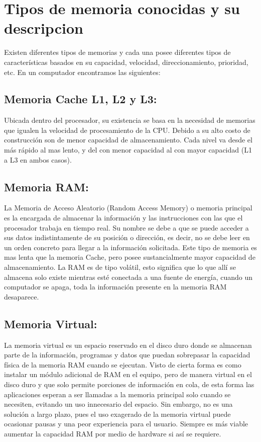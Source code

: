 \documentclass{article}
\begin{document}
\section{Tipos de memoria conocidas y su descripcion} \label{types}
Existen diferentes tipos de memorias y cada una posee diferentes tipos de características basados en su capacidad, velocidad, direccionamiento, prioridad, etc. En un computador encontramos las siguientes:

\subsection{Memoria Cache L1, L2 y L3: }
Ubicada dentro del procesador, su existencia se basa en la necesidad de memorias que igualen la velocidad de procesamiento de la CPU. Debido a su alto costo de construcción son de menor capacidad de almacenamiento. Cada nivel va desde el más rápido al mas lento, y del con menor capacidad al con mayor capacidad (L1 a L3 en ambos casos).

\subsection{Memoria RAM: }
La Memoria de Acceso Aleatorio (Random Access Memory) o memoria principal es la encargada de almacenar la información y las instrucciones con las que el procesador trabaja en tiempo real. Su nombre se debe a que se puede acceder a sus datos indistintamente de su posición o dirección, es decir, no se debe leer en un orden concreto para llegar a la información solicitada. Este tipo de memoria es mas lenta que la memoria Cache, pero posee sustancialmente mayor capacidad de almacenamiento. La RAM es de tipo volátil, esto significa que lo que allí se almacena solo existe mientras esté conectada a una fuente de energía, cuando un computador se apaga, toda la información presente en la memoria RAM desaparece.

\subsection{Memoria Virtual: }
La memoria virtual es un espacio reservado en el disco duro donde se almacenan parte de la información, programas y datos que puedan sobrepasar la capacidad física de la memoria RAM cuando se ejecutan. Visto de cierta forma es como instalar un módulo adicional de RAM en el equipo, pero de manera virtual en el disco duro y que solo permite porciones de información en cola, de esta forma las aplicaciones esperan a ser llamadas a la memoria principal solo cuando se necesiten, evitando un uso innecesario del espacio. Sin embargo, no es una solución a largo plazo, pues el uso exagerado de la memoria virtual puede ocasionar pausas y una peor experiencia para el usuario. Siempre es más viable aumentar la capacidad RAM por medio de hardware si así se requiere.
\end{document}
